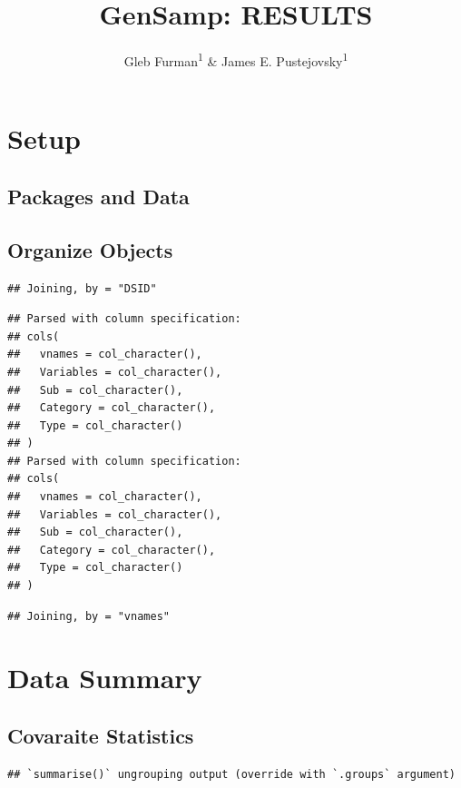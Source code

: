 \documentclass[
  english,
  man,floatsintext]{apa6}
\title{GenSamp: RESULTS}
\author{Gleb Furman\textsuperscript{1} \& James E. Pustejovsky\textsuperscript{1}}
\date{}
\affiliation{\vspace{0.5cm}\textsuperscript{1} University of Texas at Austin}
\begin{document}
\maketitle

\hypertarget{setup}{%
\section{Setup}\label{setup}}

\hypertarget{packages-and-data}{%
\subsection{Packages and Data}\label{packages-and-data}}

\hypertarget{organize-objects}{%
\subsection{Organize Objects}\label{organize-objects}}

\begin{verbatim}
## Joining, by = "DSID"
\end{verbatim}

\begin{verbatim}
## Parsed with column specification:
## cols(
##   vnames = col_character(),
##   Variables = col_character(),
##   Sub = col_character(),
##   Category = col_character(),
##   Type = col_character()
## )
## Parsed with column specification:
## cols(
##   vnames = col_character(),
##   Variables = col_character(),
##   Sub = col_character(),
##   Category = col_character(),
##   Type = col_character()
## )
\end{verbatim}

\begin{verbatim}
## Joining, by = "vnames"
\end{verbatim}

\hypertarget{data-summary}{%
\section{Data Summary}\label{data-summary}}

\hypertarget{covaraite-statistics}{%
\subsection{Covaraite Statistics}\label{covaraite-statistics}}

\begin{verbatim}
## `summarise()` ungrouping output (override with `.groups` argument)
\end{verbatim}
\end{document}

